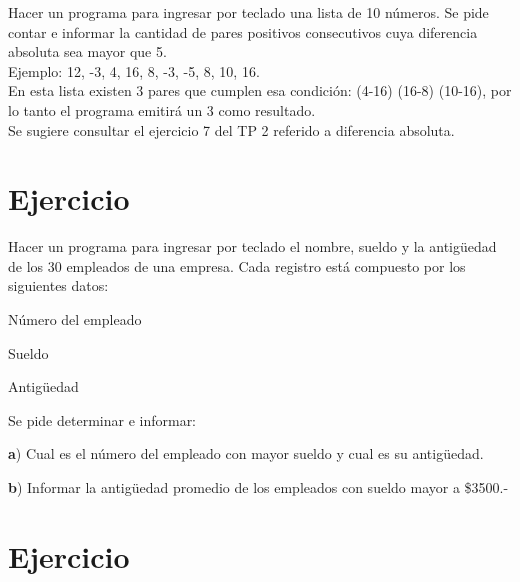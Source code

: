\documentclass[12pt,a4paper,twoside]{article}
\begin{document}
\hspace*{1cm}Hacer un programa para ingresar por teclado una lista de 10 números. Se pide contar e informar la cantidad de pares positivos consecutivos cuya diferencia absoluta sea mayor que 5.\\
Ejemplo: 12, -3, 4, 16, 8, -3, -5, 8, 10, 16.\\
En esta lista existen 3 pares que cumplen esa condición: (4-16) (16-8) (10-16), por lo tanto el programa emitirá un 3 como resultado.\\
Se sugiere consultar el ejercicio 7 del TP 2 referido a diferencia absoluta. 

\newpage

\section{Ejercicio }

\hspace*{1cm}Hacer un programa para ingresar por teclado el nombre, sueldo y la antigüedad de los 30 empleados de una empresa. Cada registro está compuesto por los siguientes datos: 
\begin{list}{•}{}
\item \textbf{}Número del empleado
\item \textbf{}Sueldo
\item \textbf{}Antigüedad 
\end{list}
Se pide determinar e informar: 
\begin{list}{•}{}
\item \textbf{a}) Cual es el número del empleado con mayor sueldo y cual es su antigüedad.
\item \textbf{b}) Informar la antigüedad promedio de los empleados con sueldo mayor a \$3500.- 
\end{list}

\newpage{\ }
\newpage

\section{Ejercicio }
\end{document}
